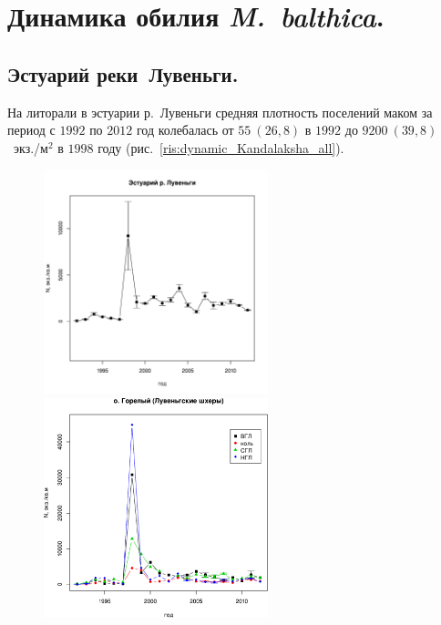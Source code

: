 	\section{Динамика обилия {\it M.~balthica}.}

		\subsection{Эстуарий реки~Лувеньги.}


На литорали в эстуарии р.~Лувеньги средняя плотность поселений маком за период с $1992$ по $2012$ год колебалась от $55~(26,8)$ в $1992$ до $9200~(39,8)$~экз./м$^2$ в $1998$ году (рис.~\ref{ris:dynamic_Kandalaksha_all}). 
	\begin{figure}[p]
	
	\begin{minipage}[b]{.46\linewidth}
	\begin{center}
	\includegraphics[width=65mm]{../White_Sea/Estuatiy_Luvenga/N_dynamic1.pdf}

	\end{center}
	\end{minipage}
	\hfil %
	\begin{minipage}[b]{.46\linewidth}
	\begin{center}
		\includegraphics[width=65mm]{../White_Sea/Luvenga_Goreliy/N_dynamic1.pdf}
	\end{center}
	\end{minipage}


\end{figure}
